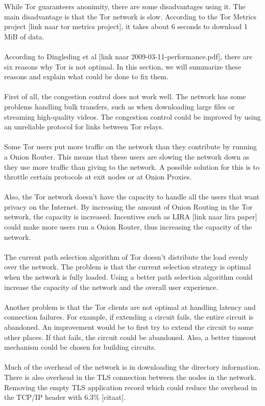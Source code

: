 \documentclass[journal]{IEEEtran}
\begin{document}
While Tor guaranteers anonimity, there are some disadvantages using it. The main disadvantage is that the Tor network is slow. According to the Tor Metrics project [link naar tor metrics project], it takes about 6 seconds to download 1 MiB of data.\\\\
According to Dingleding et al [link naar 2009-03-11-performance.pdf], there are six reasons why Tor is not optimal. In this section, we will summarize these reasons and explain what could be done to fix them.\\\\
First of all, the congestion control does not work well. The network has some problems handling bulk transfers, such as when downloading large files or streaming high-quality videos. The congestion control could be improved by using an unreliable protocol for links between Tor relays.\\\\
Some Tor users put more traffic on the network than they contribute by running a Onion Router. This means that these users are slowing the network down as they use more traffic than giving to the network. A possible solution for this is to throttle certain protocols at exit nodes or at Onion Proxies.\\\\
Also, the Tor network doesn’t have the capacity to handle all the users that want privacy on the Internet. By increasing the amount of Onion Routing in the Tor network, the capacity is increased. Incentives such as LIRA [link naar lira paper] could make more users run a Onion Router, thus increasing the capacity of the network.\\\\
The current path selection algorithm of Tor doesn’t distribute the load evenly over the network. The problem is that the current selection strategy is optimal when the network is fully loaded. Using a better path selection algorithm could increase the capacity of the network and the overall user experience.\\\\
Another problem is that the Tor clients are not optimal at handling latency and connection failures. For example, if extending a circuit fails, the entire circuit is abandoned. An improvement would be to first try to extend the circuit to some other places. If that fails, the circuit could be abandoned. Also, a better timeout mechanism could be chosen for building circuits.\\\\
Much of the overhead of the network is in downloading the directory information. There is also overhead in the TLS connection between the nodes in the network. Removing the empty TLS application record which could reduce the overhead in the TCP/IP header with 6.3\% [citaat].
		
\end{document}
